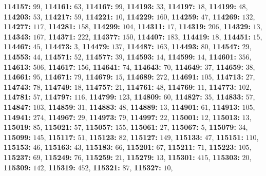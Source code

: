 \textsf{\bfseries 114157:} $99$, \textsf{\bfseries 114161:} $63$, \textsf{\bfseries 114167:} $99$, \textsf{\bfseries 114193:} $33$, \textsf{\bfseries 114197:} $18$, \textsf{\bfseries 114199:} $48$, \textsf{\bfseries 114203:} $53$, \textsf{\bfseries 114217:} $59$, \textsf{\bfseries 114221:} $10$, \textsf{\bfseries 114229:} $160$, \textsf{\bfseries 114259:} $47$, \textsf{\bfseries 114269:} $132$, \textsf{\bfseries 114277:} $117$, \textsf{\bfseries 114281:} $158$, \textsf{\bfseries 114299:} $104$, \textsf{\bfseries 114311:} $17$, \textsf{\bfseries 114319:} $206$, \textsf{\bfseries 114329:} $13$, \textsf{\bfseries 114343:} $167$, \textsf{\bfseries 114371:} $222$, \textsf{\bfseries 114377:} $150$, \textsf{\bfseries 114407:} $183$, \textsf{\bfseries 114419:} $18$, \textsf{\bfseries 114451:} $15$, \textsf{\bfseries 114467:} $45$, \textsf{\bfseries 114473:} $3$, \textsf{\bfseries 114479:} $137$, \textsf{\bfseries 114487:} $163$, \textsf{\bfseries 114493:} $80$, \textsf{\bfseries 114547:} $29$, \textsf{\bfseries 114553:} $44$, \textsf{\bfseries 114571:} $52$, \textsf{\bfseries 114577:} $39$, \textsf{\bfseries 114593:} $14$, \textsf{\bfseries 114599:} $14$, \textsf{\bfseries 114601:} $356$, \textsf{\bfseries 114613:} $506$, \textsf{\bfseries 114617:} $156$, \textsf{\bfseries 114641:} $74$, \textsf{\bfseries 114643:} $70$, \textsf{\bfseries 114649:} $37$, \textsf{\bfseries 114659:} $38$, \textsf{\bfseries 114661:} $95$, \textsf{\bfseries 114671:} $79$, \textsf{\bfseries 114679:} $15$, \textsf{\bfseries 114689:} $272$, \textsf{\bfseries 114691:} $105$, \textsf{\bfseries 114713:} $27$, \textsf{\bfseries 114743:} $78$, \textsf{\bfseries 114749:} $18$, \textsf{\bfseries 114757:} $21$, \textsf{\bfseries 114761:} $48$, \textsf{\bfseries 114769:} $11$, \textsf{\bfseries 114773:} $102$, \textsf{\bfseries 114781:} $57$, \textsf{\bfseries 114797:} $116$, \textsf{\bfseries 114799:} $123$, \textsf{\bfseries 114809:} $60$, \textsf{\bfseries 114827:} $35$, \textsf{\bfseries 114833:} $57$, \textsf{\bfseries 114847:} $103$, \textsf{\bfseries 114859:} $31$, \textsf{\bfseries 114883:} $48$, \textsf{\bfseries 114889:} $13$, \textsf{\bfseries 114901:} $61$, \textsf{\bfseries 114913:} $105$, \textsf{\bfseries 114941:} $274$, \textsf{\bfseries 114967:} $29$, \textsf{\bfseries 114973:} $79$, \textsf{\bfseries 114997:} $22$, \textsf{\bfseries 115001:} $12$, \textsf{\bfseries 115013:} $13$, \textsf{\bfseries 115019:} $85$, \textsf{\bfseries 115021:} $57$, \textsf{\bfseries 115057:} $155$, \textsf{\bfseries 115061:} $27$, \textsf{\bfseries 115067:} $5$, \textsf{\bfseries 115079:} $34$, \textsf{\bfseries 115099:} $145$, \textsf{\bfseries 115117:} $51$, \textsf{\bfseries 115123:} $82$, \textsf{\bfseries 115127:} $149$, \textsf{\bfseries 115133:} $47$, \textsf{\bfseries 115151:} $110$, \textsf{\bfseries 115153:} $46$, \textsf{\bfseries 115163:} $43$, \textsf{\bfseries 115183:} $66$, \textsf{\bfseries 115201:} $67$, \textsf{\bfseries 115211:} $71$, \textsf{\bfseries 115223:} $105$, \textsf{\bfseries 115237:} $69$, \textsf{\bfseries 115249:} $76$, \textsf{\bfseries 115259:} $21$, \textsf{\bfseries 115279:} $13$, \textsf{\bfseries 115301:} $415$, \textsf{\bfseries 115303:} $20$, \textsf{\bfseries 115309:} $142$, \textsf{\bfseries 115319:} $452$, \textsf{\bfseries 115321:} $87$, \textsf{\bfseries 115327:} $10$, 
